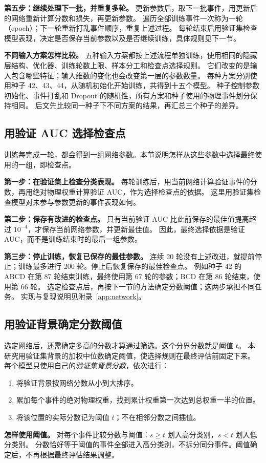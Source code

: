 \documentclass[11pt,a4paper,fontset=fandol,scheme=plain]{ctexart}
\begin{document}
\textbf{第五步：继续处理下一批，并重复多轮。}
更新参数后，取下一批事件，用更新后的网络重新计算分数和损失，再更新参数。
遍历全部训练事件一次称为一轮（epoch）；下一轮重新打乱事件顺序，重复上述过程。
每轮结束后用验证集检查模型表现，决定是否保存当前参数以及是否继续训练，具体规则见下一节。

\textbf{不同输入方案怎样比较。}
五种输入方案都按上述流程单独训练，使用相同的隐藏层结构、优化器、训练轮数上限、样本分工和检查点选择规则。
它们改变的是输入包含哪些特征；输入维数的变化也会改变第一层的参数数量。
每种方案分别使用种子 42、43、44，从随机初始化开始训练，共得到十五个模型。
种子控制参数初始化、事件打乱和 Dropout 的随机性，所有方案和种子使用的物理事件划分保持相同。
后文先比较同一种子下不同方案的结果，再汇总三个种子的差异。

\subsection{用验证 AUC 选择检查点}

训练每完成一轮，都会得到一组网络参数。本节说明怎样从这些参数中选择最终使用的一组，即检查点。

\textbf{第一步：在验证集上检查分类表现。}
每轮训练后，用当前网络计算验证事件的分数，再用绝对物理权重计算验证 AUC，作为选择检查点的依据。
这里用验证集检查模型对未参与参数更新的事件表现如何。

\textbf{第二步：保存有改进的检查点。}
只有当前验证 AUC 比此前保存的最佳值提高超过 $10^{-4}$，才保存当前网络参数，并更新最佳值。
因此，最终选择依据是验证 AUC，而不是训练结束时的最后一组参数。

\textbf{第三步：停止训练，恢复已保存的最佳参数。}
连续 20 轮没有上述改进，就提前停止；训练最多进行 200 轮。停止后恢复保存的最佳检查点。
例如种子 42 的 ABCD 在第 87 轮结束训练，最终使用第 67 轮的参数；BCD 在第 86 轮结束，使用第 66 轮。
选定检查点后，再按下一节的方法确定分数阈值；这两步承担不同任务。
实现与复现说明见附录~\ref{app:network}。

\subsection{用验证背景确定分数阈值}
\label{sec:threshold}

选定网络后，还需确定多高的分数才算通过筛选。这个分界分数就是阈值 $t$。
本研究用验证集背景的加权中位数确定阈值，使选择规则在最终评估前固定下来。
每个模型只使用自己的\emph{验证集背景分数}，依次进行：
\begin{enumerate}[leftmargin=1.7em,itemsep=2pt,topsep=3pt]
\item 将验证背景按网络分数从小到大排序。
\item 累加每个事件的绝对物理权重，找到累计权重第一次达到总权重一半的位置。
\item 将该位置的实际分数记为阈值 $t$；不在相邻分数之间插值。
\end{enumerate}
\textbf{怎样使用阈值。} 对每个事件比较分数与阈值：$s\geq t$ 划入高分类别，$s<t$ 划入低分类别。
分数恰好等于阈值的事件全部进入高分类别，不拆分同分事件。阈值确定后，不再根据最终评估结果调整。
\end{document}
